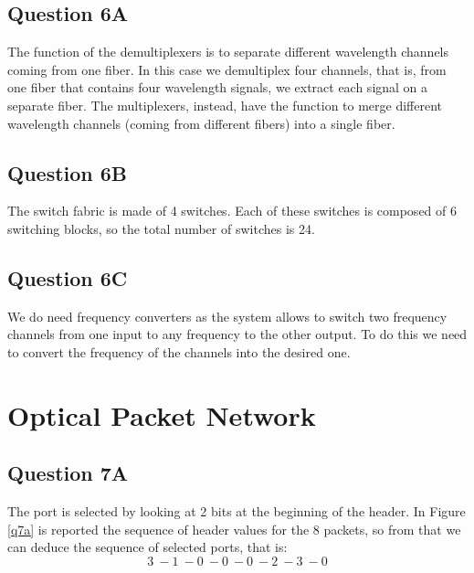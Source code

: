 \documentclass[a4paper,10pt]{report}
\begin{document}
\subsection*{Question 6A}
The function of the demultiplexers is to separate different wavelength channels coming from one fiber. In this case we demultiplex four channels,
that is, from one fiber that contains four wavelength signals, we extract each signal on a separate fiber.
The multiplexers, instead, have the function to merge different wavelength channels (coming from different fibers)
into a single fiber.

\subsection*{Question 6B}
The switch fabric is made of 4 switches. Each of these switches is composed of 6 switching blocks, so the total number of switches is 24.

\subsection*{Question 6C}
We do need frequency converters as the system allows to switch two frequency channels from one input to
any frequency to the other output. To do this we need to convert the frequency of the channels into the desired one.


\newpage
\section*{Optical Packet Network}

\subsection*{Question 7A}
The port is selected by looking at 2 bits at the beginning of the header.
In Figure \ref{q7a} is reported the sequence of header values for the 8 packets, so from that we can deduce the sequence of
selected ports, that is: $$3 \ - 1 \ - 0 \ - 0 \ - 0 \ - 2 \ - 3 \ - 0$$
\end{document}
